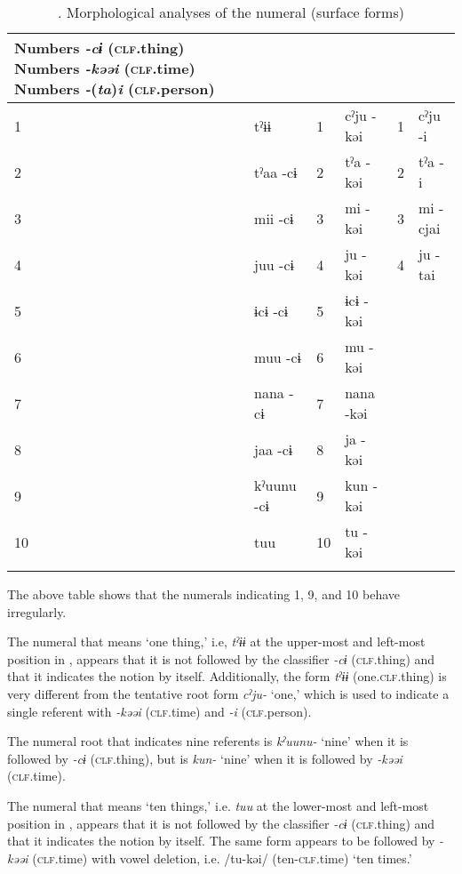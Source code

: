 \begin{table}
\caption{\label{tab:key:50}. Morphological analyses of the numeral (surface forms)}
\begin{tabularx}{\textwidth}{Xl ll ll}
\lsptoprule
Numbers  \textit{{}-cɨ} (\textsc{clf}.thing)    Numbers  \textit{{}-kəəi} (\textsc{clf}.time)    Numbers  \textit{{}-}(\textit{ta})\textit{i} (\textsc{clf}.person)\\
\midrule
1  &tˀɨɨ          &  1 & cˀju  {}-kəi& 1  &  cˀju  {}-i\\
2  &tˀaa    {}-cɨ &  2 & tˀa  {}-kəi & 2  & tˀa  {}-i  \\
3  &mii    {}-cɨ  &  3 & mi  {}-kəi  & 3  & mi  {}-cjai \\
4  &juu    {}-cɨ  &  4 & ju  {}-kəi  & 4  & ju  {}-tai  \\
5  &ɨcɨ    {}-cɨ  &  5 & ɨcɨ  {}-kəi &    &            \\
6  &muu    {}-cɨ  &  6 & mu  {}-kəi  &    &            \\
7  &nana    {}-cɨ &  7 & nana  {}-kəi&    &            \\
8  &jaa    {}-cɨ  &  8 & ja  {}-kəi  &    &            \\
9  &kˀuunu {}-cɨ  &  9 & kun  {}-kəi &    &            \\
10 & tuu          & 10 & tu  {}-kəi  &    &            \\
\lspbottomrule
\end{tabularx}
\end{table}

 The above table shows that the numerals indicating 1, 9, and 10 behave irregularly.

 The numeral that means ‘one thing,’ i.e, \textit{tˀɨɨ} at the upper-most and left-most position in , appears that it is not followed by the classifier \textit{{}-cɨ} (\textsc{clf}.thing) and that it indicates the notion by itself. Additionally, the form \textit{tˀɨɨ} (one.\textsc{clf}.thing) is very different from the tentative root form \textit{cˀju-} ‘one,’ which is used to indicate a single referent with \textit{-kəəi} (\textsc{clf}.time) and \textit{{}-i} (\textsc{clf}.person).

 The numeral root that indicates nine referents is \textit{kˀuunu-} ‘nine’ when it is followed by \textit{{}-cɨ} (\textsc{clf}.thing), but is \textit{kun-} ‘nine’ when it is followed by \textit{{}-kəəi} (\textsc{clf}.time).

The numeral that means ‘ten things,’ i.e. \textit{tuu} at the lower-most and left-most position in , appears that it is not followed by the classifier \textit{{}-cɨ} (\textsc{clf}.thing) and that it indicates the notion by itself. The same form appears to be followed by \textit{{}-kəəi} (\textsc{clf}.time) with vowel deletion, i.e. /tu-kəi/ (ten-\textsc{clf}.time) ‘ten times.’

